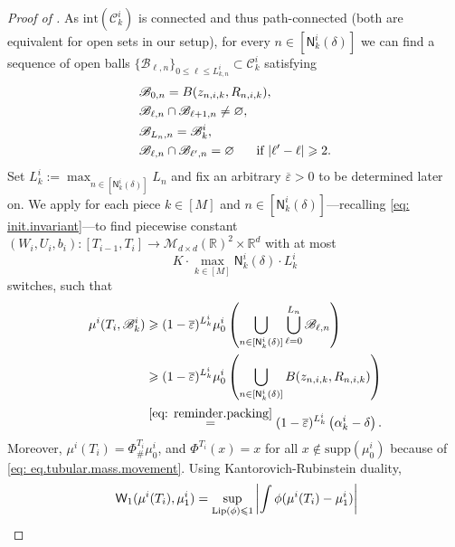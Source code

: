 \documentclass[a4paper,11pt]{article}
\theoremstyle{plain}
\newcommand{\supp}{\mathrm{supp}}
\newcommand{\R}{\mathbb{R}}
\newcommand{\bW}{\bm{\mathit{W}}}
\newcommand{\bU}{\bm{\mathit{U}}}
\renewcommand{\leq}{\leqslant}
\renewcommand{\geq}{\geqslant}
\numberwithin{equation}{section}
\begin{document}
\begin{proof}[Proof of ]
As $\mathrm{int}\left(\mathscr{C}^i_k\right)$ is connected and thus path-connected (both are equivalent for open sets in our setup), for every $n\in[\mathsf{N}_{k}^i(\delta)]$ we can find a sequence of open balls $\{\mathscr{B}_{\ell,n}\}_{0\leq\ell\leq L_{k, n}^i}\subset \mathscr{C}_k^i$ satisfying
\begin{equation}\label{eq: homotopy}
    \begin{aligned}
        &\mathscr{B}_{0,n}=B(z_{n,i,k},R_{n,i,k}),\\ 
        &\mathscr{B}_{\ell,n}\cap \mathscr{B}_{\ell+1,n}\neq \varnothing,\\
        &\mathscr{B}_{L_{n},n}=\mathscr{B}_k^i,\\
        &\mathscr{B}_{\ell,n}\cap\mathscr{B}_{\ell',n}=\varnothing\hspace{0.5cm}\text{ if }|\ell'-\ell|\geq 2.
    \end{aligned}
\end{equation}
Set $L_k^i:=\max_{n\in[\mathsf{N}_{k}^i(\delta)]} L_{n}$ and  fix an arbitrary $\overline{\varepsilon}>0$ to be determined later on. 
We apply  for each piece $k\in[M]$ and $n\in[\mathsf{N}_k^i(\delta)]$---recalling \eqref{eq: init.invariant}---to find piecewise constant $(\bW_i, \bU_i, b_i):[T_{i-1}, T_i]\to\mathscr{M}_{d\times d}(\mathbb{R})^2\times\R^d$ with at most
\begin{equation*}
    K\cdot \max_{k\in[M]} \mathsf{N}_k^i(\delta)\cdot L_k^i
\end{equation*}
switches, such that
\begin{align}\label{eq: mass.lower.bound}
    \mu^i(T_i,\mathscr{B}_k^i)&\geq (1-\overline{\varepsilon})^{L_k^i} \mu_0^i\left(\bigcup_{n\in[\mathsf{N}_{k}^i(\delta)]}\bigcup_{\ell=0}^{L_{n}} \mathscr{B}_{\ell, n} \right)\nonumber\\
    &\geq (1-\overline{\varepsilon})^{L_k^i} \mu_0^i\left(\bigcup_{n\in[\mathsf{N}_{k}^i(\delta)]} B(z_{n,i,k},R_{n,i,k})\right)\nonumber\\
    &\overset{\eqref{eq: reminder.packing}}{=}(1-\overline{\varepsilon})^{L_k^i} \left(\alpha_k^i-\delta \right).
\end{align}
Moreover, $\mu^i(T_i)=\Phi^{T_i}_\#\mu^i_0$, and $\Phi^{T_i}(x)=x$ for all $x\notin \supp(\mu_0^i)$ because of \eqref{eq: eq.tubular.mass.movement}. 
Using Kantorovich-Rubinstein duality,
\begin{align*}
&\hspace{0.1cm}\mathsf{W}_1(\mu^i(T_i),\mu^i_1) = \sup_{\mathrm{Lip}(\phi)\leq 1}\left|\int\phi(\mu^i(T_i)-\mu_1^i)\right|\\

\end{align*}
\end{proof}
\end{document}
